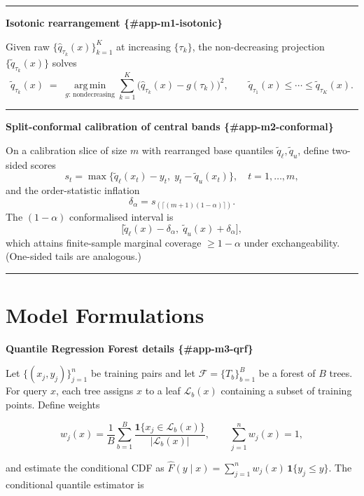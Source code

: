 \documentclass[
  a4paper,
  DIV=11,
  numbers=noendperiod]{scrreprt}
\begin{document}
\begin{center}\rule{0.5\linewidth}{0.5pt}\end{center}

\textbf{Isotonic rearrangement \{\#app-m1-isotonic\}}

Given raw \(\{\widehat q_{\tau_k}(x)\}_{k=1}^K\) at increasing
\(\{\tau_k\}\), the non-decreasing projection
\(\{\tilde q_{\tau_k}(x)\}\) solves \[
\tilde q_{\tau_k}(x) \;=\; \operatorname*{arg\,min}_{g:\,\text{nondecreasing}} 
\sum_{k=1}^K \big(\widehat q_{\tau_k}(x)-g(\tau_k)\big)^2,
\qquad
\tilde q_{\tau_1}(x)\le\cdots\le \tilde q_{\tau_K}(x).
\]

\begin{center}\rule{0.5\linewidth}{0.5pt}\end{center}

\textbf{Split-conformal calibration of central bands
\{\#app-m2-conformal\}}

On a calibration slice of size \(m\) with rearranged base quantiles
\(\tilde q_\ell,\tilde q_u\), define two-sided scores \[
s_t=\max\{\tilde q_\ell(x_t)-y_t,\; y_t-\tilde q_u(x_t)\},\quad t=1,\dots,m,
\] and the order-statistic inflation \[
\delta_\alpha = s_{(\lceil (m+1)(1-\alpha)\rceil)}.
\] The \((1-\alpha)\) conformalised interval is \[
\big[\tilde q_\ell(x)-\delta_\alpha,\;\tilde q_u(x)+\delta_\alpha\big],
\] which attains finite-sample marginal coverage \(\ge 1-\alpha\) under
exchangeability. (One-sided tails are analogous.)

\begin{center}\rule{0.5\linewidth}{0.5pt}\end{center}

\section{Model Formulations}\label{model-formulations}

\textbf{Quantile Regression Forest details \{\#app-m3-qrf\}}

Let \(\{(x_j,y_j)\}_{j=1}^n\) be training pairs and let
\(\mathcal F = \{ T_b \}_{b=1}^B\) be a forest of \(B\) trees. For query
\(x\), each tree assigns \(x\) to a leaf \(\mathcal L_b(x)\) containing
a subset of training points. Define weights

\[
 w_j(x) = \frac{1}{B} \sum_{b=1}^{B} \frac{\mathbf{1}\{ x_j \in \mathcal L_b(x) \}}{ |\mathcal L_b(x)| },
 \qquad
 \sum_{j=1}^n w_j(x) = 1,
\]

and estimate the conditional CDF as
\(\widehat F(y\mid x) = \sum_{j=1}^n w_j(x)\,\mathbf{1}\{ y_j \le y \}\).
The conditional quantile estimator is
\end{document}
